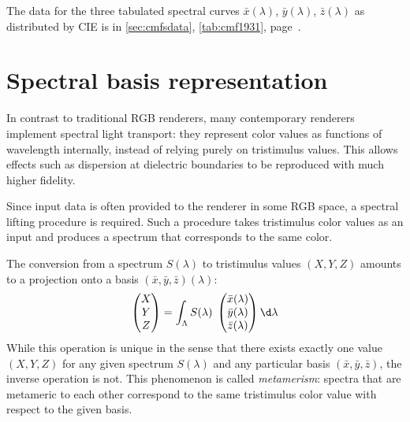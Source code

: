 The data for the three tabulated spectral curves $\bar x(\lambda)$, $\bar
y(\lambda)$, $\bar z(\lambda)$ as distributed by CIE is in
\cref{sec:cmfsdata}, \cref{tab:cmf1931},
page~\pageref{tab:cmf1931}.

\section{Spectral basis representation}
\label{sec:spec_basis}

In contrast to traditional RGB renderers, many contemporary renderers implement 
spectral light transport: they represent color values as functions of wavelength
internally, instead of relying purely on tristimulus values.
This allows effects such
as dispersion at dielectric boundaries to be reproduced with much higher fidelity.

Since input data is often provided to the renderer in some \gls{RGB} space,
a spectral lifting procedure is required. Such a procedure takes
tristimulus color values as an input and produces a spectrum that
corresponds to the same color.

The conversion from a spectrum $S(\lambda)$ to tristimulus values 
$(X, Y, Z)$ amounts to a projection onto a basis $(\bar x, \bar y, \bar z)(\lambda)$:
\begin{equation}
    \begin{pmatrix}X\\Y\\Z\end{pmatrix}
        = \int_\Lambda S(\lambda)\; 
    \begin{pmatrix}
        \bar x(\lambda)\\
        \bar y(\lambda)\\
        \bar z(\lambda)
    \end{pmatrix}
    \d\lambda
    \label{eqn:color_matching}
\end{equation}
While this operation is unique in the sense that there exists exactly one
value $(X,Y,Z)$ for any given spectrum $S(\lambda)$ and any particular basis
$(\bar x,\bar y, \bar z)$, the inverse operation is not. This phenomenon is called
\emph{metamerism}: spectra that are metameric to each other correspond to the
same tristimulus color value with respect to the given basis.

